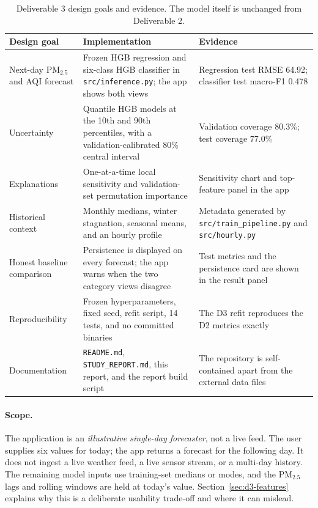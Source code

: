 \begin{table}[htbp]
\centering
\footnotesize
\begin{tabular}{@{}L{3.7cm}L{7.0cm}L{4.6cm}@{}}
\toprule
\textbf{Design goal} & \textbf{Implementation} & \textbf{Evidence} \\
\midrule
Next-day PM$_{2.5}$ and AQI forecast &
Frozen HGB regression and six-class HGB classifier in
\texttt{src/inference.py}; the app shows both views &
Regression test RMSE 64.92; classifier test macro-F1 0.478 \\
Uncertainty &
Quantile HGB models at the 10th and 90th percentiles, with a
validation-calibrated 80\% central interval &
Validation coverage 80.3\%; test coverage 77.0\% \\
Explanations &
One-at-a-time local sensitivity and validation-set permutation
importance &
Sensitivity chart and top-feature panel in the app \\
Historical context &
Monthly medians, winter stagnation, seasonal means, and an
hourly profile &
Metadata generated by \texttt{src/train\_pipeline.py} and
\texttt{src/hourly.py} \\
Honest baseline comparison &
Persistence is displayed on every forecast; the app warns when
the two category views disagree &
Test metrics and the persistence card are shown in the result
panel \\
Reproducibility &
Frozen hyperparameters, fixed seed, refit script, 14 tests, and
no committed binaries &
The D3 refit reproduces the D2 metrics exactly \\
Documentation &
\texttt{README.md}, \texttt{STUDY\_REPORT.md}, this report, and
the report build script &
The repository is self-contained apart from the external data
files \\
\bottomrule
\end{tabular}
\caption{Deliverable 3 design goals and evidence. The model itself is unchanged
from Deliverable 2.}
\label{tab:d3-goals}
\end{table}

\paragraph{Scope.} The application is an \emph{illustrative single-day
forecaster}, not a live feed. The user supplies six values for today; the app
returns a forecast for the following day. It does not ingest a live weather
feed, a live sensor stream, or a multi-day history. The remaining model inputs
use training-set medians or modes, and the PM$_{2.5}$ lags and rolling windows
are held at today's value. Section~\ref{sec:d3-features} explains why this is a
deliberate usability trade-off and where it can mislead.


